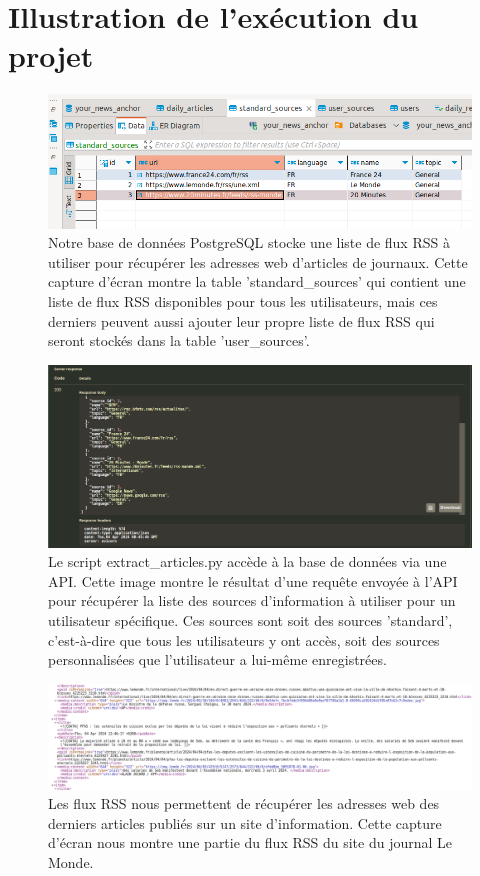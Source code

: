 \documentclass[french]{article}
\begin{document}
    \section*{Illustration de l'exécution du projet}
    \label{img:screenshots_processus}
    \begin{figure}[h!]
        \includegraphics[width=12cm]{db_1}
        \centering
        \caption{Notre base de données PostgreSQL stocke une liste de flux RSS à utiliser pour récupérer les adresses web d'articles de journaux. Cette capture d'écran montre la table 'standard\_sources' qui contient une liste de flux RSS disponibles pour tous les utilisateurs, mais ces derniers peuvent aussi ajouter leur propre liste de flux RSS qui seront stockés dans la table 'user\_sources'.}
        \centering
    \end{figure}
    \begin{figure}[h!]
        \includegraphics[width=12cm]{api_1}
        \centering
        \caption{Le script extract\_articles.py accède à la base de données via une API. Cette image montre le résultat d'une requête envoyée à l'API pour récupérer la liste des sources d'information à utiliser pour un utilisateur spécifique. Ces sources sont soit des sources 'standard', c'est-à-dire que tous les utilisateurs y ont accès, soit des sources personnalisées que l'utilisateur a lui-même enregistrées.}
        \centering
    \end{figure}
    \begin{figure}[h!]
        \includegraphics[width=12cm]{rss}
        \centering
        \caption{Les flux RSS nous permettent de récupérer les adresses web des derniers articles publiés sur un site d'information. Cette capture d'écran nous montre une partie du flux RSS du site du journal Le Monde.}
        \centering
    \end{figure}
\end{document}
